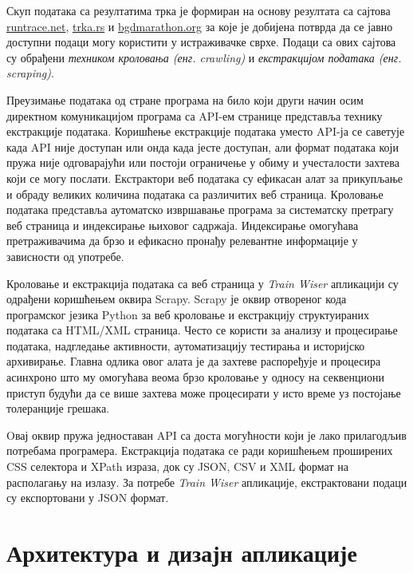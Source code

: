 \documentclass[12pt,oneside]{memoir}
\begin{document}
Скуп података са резултатима трка је формиран на основу резултата са сајтова \href{https://www.runtrace.net}{runtrace.net}, \href{https://www.trka.rs}{trka.rs} и \href{https://www.bgdmarathon.org}{bgdmarathon.org} за које је добијена потврда да се јавно доступни подаци могу користити у истраживачке сврхе. Подаци са ових сајтова су обрађени \textit{техником кроловања (енг. crawling)} и \textit{екстракцијом података (енг. scraping)}.

Преузимање података од стране програма на било који други начин осим директном комуникацијом програма са API-ем странице представља технику екстракције података. Коришћење екстракције података уместо API-ја се саветује када %
API није доступан или онда када јесте доступан, али формат података који пружа није одговарајући или постоји ограничење у обиму и учесталости захтева који се могу послати. Екстрактори веб података су ефикасан алат за прикупљање и обраду великих количина података са различитих веб страница. \cite{web_scraping_with_python} Кроловање података представља аутоматско извршавање програма за систематску претрагу веб страница и индексирање њиховог садржаја. Индексирање омогућава претраживачима да брзо и ефикасно пронађу релевантне информације у зависности од употребе. \cite{web_crawler}

Кроловање и екстракција података са веб страница у \textit{Train Wiser} апликацији су одрађени коришћењем оквира Scrapy. Scrapy је оквир отвореног кода програмског језика Python за веб кроловање и екстракцију структуираних података са HTML/XML страница. Често се користи за анализу и процесирање података, надгледање активности, аутоматизацију тестирања и историјско архивирање. Главна одлика овог алата је да захтеве распоређује и процесира асинхроно што му омогућава веома брзо кроловање у односу на секвенциони приступ будући да се више захтева може процесирати у исто време уз постојање толеранције грешака. 

Oвај оквир пружа једноставан API са доста могућности који је лако прилагодљив потребама програмера. Екстракција података се ради коришћењем проширених CSS селектора и XPath израза, док су JSON, CSV и XML формат на располагању на излазу. \cite{scrapy_doc} За потребе \textit{Train Wiser} апликације, екстрактовани подаци су експортовани у JSON формат. %

\section{Архитектура и дизајн апликације}
\end{document}
